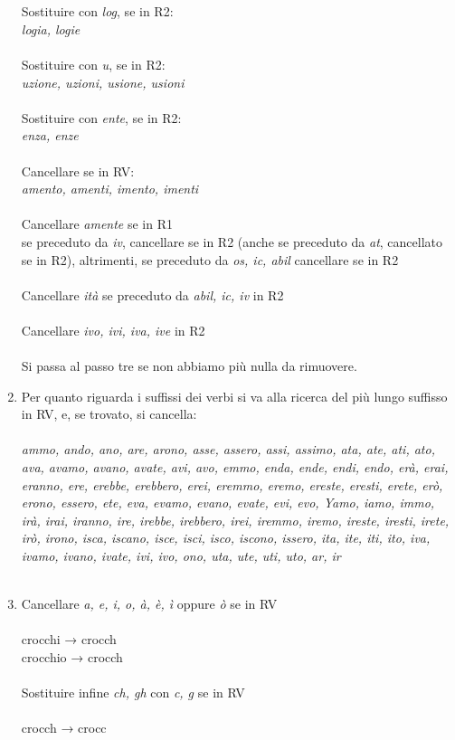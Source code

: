 \documentclass{article}
\theoremstyle{plain}
\theoremstyle{definition}
\begin{document}
\begin{enumerate}
\\
\\
Sostituire con \textit{log}, se in R2:
\\ 
\textit{logia, logie}
\\
\\
Sostituire con \textit{u}, se in R2:
\\
\textit{uzione, uzioni, usione, usioni} 
\\
\\
Sostituire con \textit{ente}, se in R2:
\\
\textit{enza, enze}  
\\
\\
Cancellare se in RV:
\\
\textit{amento, amenti, imento, imenti}
\\
\\
Cancellare \textit{amente} se in R1
\\
se preceduto da \textit{iv}, cancellare se in R2 (anche se preceduto da \textit{at}, cancellato se in R2), altrimenti, se preceduto da \textit{os, ic, abil} cancellare se in R2 
\\
\\
Cancellare \textit{ità} se preceduto da \textit{abil, ic, iv} in R2
\\
\\
Cancellare \textit{ivo, ivi, iva, ive} in R2 
\\
\\
Si passa al passo tre se non abbiamo più nulla da rimuovere.

\item Per quanto riguarda i suffissi dei verbi si va alla ricerca del più lungo suffisso in RV, e, se trovato, si cancella:
\\
\\
\textit{ammo, ando, ano, are, arono, asse, assero, assi, assimo, ata, ate, ati, ato, ava, avamo, avano, avate, avi, avo, emmo, enda, ende, endi, endo, erà, erai, eranno, ere, erebbe, erebbero, erei, eremmo, eremo, ereste, eresti, erete, erò, erono, essero, ete, eva, evamo, evano, evate, evi, evo, Yamo, iamo, immo, irà, irai, iranno, ire, irebbe, irebbero, irei, iremmo, iremo, ireste, iresti, irete, irò, irono, isca, iscano, isce, isci, isco, iscono, issero, ita, ite, iti, ito, iva, ivamo, ivano, ivate, ivi, ivo, ono, uta, ute, uti, uto, ar, ir}
\\
\\
\item Cancellare \textit{a, e, i, o, à, è, ì} oppure \textit{ò} se in RV
\\
\\
crocchi → crocch
\\
crocchio → crocch 
\\
\\
Sostituire infine \textit{ch, gh} con \textit{c, g} se in RV 
\\
\\
crocch → crocc 

\end{enumerate}
\end{document}
